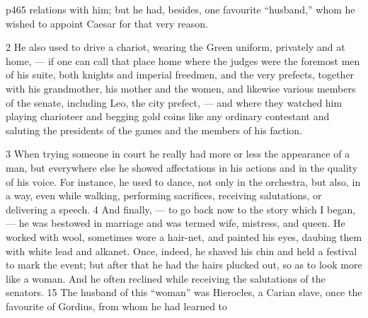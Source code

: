 p465 relations with him; but he had, besides, one favourite ``husband,'' whom he wished to appoint Caesar for that very reason.

2
He also used to drive a chariot, wearing the Green uniform, privately and at home, \texthebrew{—} if one can call that place home where the judges were the foremost men of his suite, both knights and imperial freedmen, and the very prefects, together with his grandmother, his mother and the women, and likewise various members of the senate, including Leo, the city prefect, \texthebrew{—} and where they watched him playing charioteer and begging gold coins like any ordinary contestant and saluting the presidents of the games and the members of his faction.

3
When trying someone in court he really had more or less the appearance of a man, but everywhere else he showed affectations in his actions and in the quality of his voice. For instance, he used to dance, not only in the orchestra, but also, in a way, even while walking, performing sacrifices, receiving salutations, or delivering a speech. 4 And finally, \texthebrew{—} to go back now to the story which I began, \texthebrew{—} he was bestowed in marriage and was termed wife, mistress, and queen. He worked with wool, sometimes wore a hair-net, and painted his eyes, daubing them with white lead and alkanet. Once, indeed, he shaved his chin and held a festival to mark the event; but after that he had the hairs plucked out, so as to look more like a woman. And he often reclined while receiving the salutations of the senators. 15 The husband of this ``woman'' was Hierocles, a Carian slave, once the favourite of Gordius, from whom he had learned to

